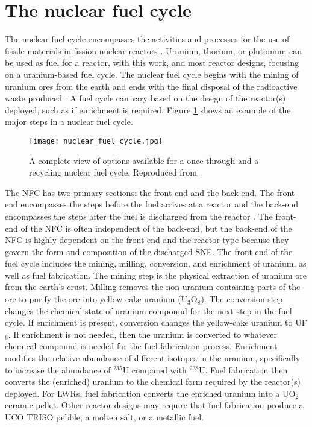 %
%
%
\section{The nuclear fuel cycle}
The nuclear fuel cycle encompasses the activities and processes 
for the use of fissile materials in fission nuclear reactors 
\cite{tsoulfanidis_nuclear_2013}. 
Uranium, thorium, or plutonium can be used as 
fuel for a reactor, with this work, and most reactor designs, focusing on 
a uranium-based 
fuel cycle. The nuclear fuel cycle begins with the mining of uranium ores 
from the earth and ends with the final disposal of the radioactive 
waste produced 
\cite{tsoulfanidis_nuclear_2013}. A fuel cycle can vary based on the
design of the reactor(s) deployed, such as if enrichment is required.  
Figure \ref{fig:fuel_cycle} shows 
an example of the major steps in a nuclear fuel cycle. 

\begin{figure}
    \centering
    \texttt{[image: nuclear\_fuel\_cycle.jpg]}
    \caption{A complete view of options available for a once-through and 
    a recycling nuclear fuel cycle. Reproduced from 
    \protect\cite{us_nuclear_regulatory_commission_stages_2020}.}
    \label{fig:fuel_cycle}
\end{figure}

The \gls{NFC} has two primary sections: the front-end and 
the back-end. 
The front end encompasses the steps before the fuel arrives at a reactor 
and the back-end encompasses the steps after the fuel is discharged 
from the reactor \cite{rodriguez-penalonga_review_2017}. The front-end of 
the \gls{NFC} is often independent of the back-end, but the back-end 
of the \gls{NFC} is highly dependent on the front-end and the reactor 
type because they govern the form and composition of the discharged 
\gls{SNF}. The front-end of the fuel cycle includes the mining, 
milling, conversion, and enrichment of uranium, as well as 
fuel fabrication. The mining step is the physical extraction of uranium 
ore from the earth's crust. Milling removes the non-uranium containing 
parts of the ore to purify the ore into yellow-cake uranium (U$_3$O$_8$).
The conversion step changes the chemical state of uranium compound 
for the next step in the fuel cycle. If enrichment is present, conversion 
changes the yellow-cake uranium to UF$_6$. If enrichment is not 
needed, then the uranium is converted to whatever chemical compound is 
needed for the fuel fabrication process. Enrichment modifies the 
relative abundance of different isotopes in the uranium, specifically 
to increase the abundance of $^{235}$U compared with $^{238}$U. Fuel 
fabrication then converts the (enriched) uranium to the chemical 
form required by the reactor(s) deployed. For \glspl{LWR}, fuel 
fabrication converts the enriched uranium into a UO$_2$ ceramic 
pellet. Other reactor designs may require that fuel fabrication 
produce a UCO \gls{TRISO} pebble, a molten salt, or a metallic fuel. 

